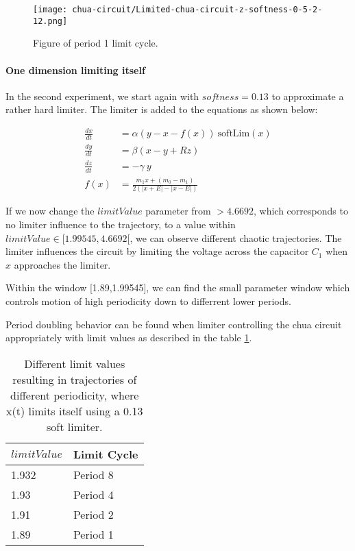 \documentclass[main]{subfiles}
\begin{document}
\begin{figure}[H]
\centering
\texttt{[image: chua-circuit/Limited-chua-circuit-z-softness-0-5-2-12.png]}
\caption[Figure of period 1 limit cycle.]{Figure of period 1 limit cycle.}
\label{figure:z-0.5-1-limit-cycle-trajectory}
\end{figure}

\paragraph{One dimension limiting itself} In the second experiment, we start again with \(softness=0.13\) to approximate a rather hard limiter. The limiter is added to the equations as shown below:

\begin{align*}
\frac{dx}{dt}&=\alpha (y-x-f(x)) ~ \text{softLim}(x)\\
\frac{dy}{dt}&=\beta (x-y + Rz)\\
\frac{dz}{dt}&=-\gamma ~ y\\
f (x) &= \frac{m_1 x + (m_0 - m_1)}{2 (| x + E | -| x - E |)}
\end{align*}

If we now change the $limitValue$ parameter from \(>4.6692\), which corresponds to no limiter influence to the trajectory, to a value within \(limitValue \in [1.99545,4.6692[\), we can observe different chaotic trajectories. The limiter influences the circuit by limiting the voltage across the capacitor \(C_1\) when \(x\) approaches the limiter.

Within the window [1.89,1.99545], we can find the small parameter window which controls motion of high periodicity down to differrent lower periods.

Period doubling behavior can be found when limiter controlling the chua circuit appropriately with limit values as described in the table \ref{table:x-0.13-periodicities}.

\begin{table}[H]
\renewcommand{\arraystretch}{1.2}
\center
\begin{tabular}{@{}ll@{}}
	\toprule
   \(limitValue\) & Limit Cycle\\
   \midrule
   1.932 & Period 8 \\ 
   1.93 & Period 4 \\
   1.91  & Period 2 \\
   1.89 & Period 1 \\
   \bottomrule
\end{tabular}
\caption[Limiter values for periodic trajectories for for an x self-limiting limiter with softness 0.13]{Different limit values resulting in trajectories of different periodicity, where x(t) limits itself using a 0.13 soft limiter.}
\label{table:x-0.13-periodicities}
\end{table}
\end{document}
